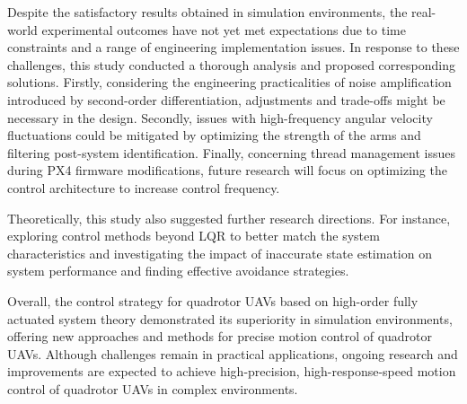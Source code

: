 \begin{digest}
Despite the satisfactory results obtained in simulation environments, the real-world experimental outcomes have not yet met expectations due to time constraints and a range of engineering implementation issues. In response to these challenges, this study conducted a thorough analysis and proposed corresponding solutions. Firstly, considering the engineering practicalities of noise amplification introduced by second-order differentiation, adjustments and trade-offs might be necessary in the design. Secondly, issues with high-frequency angular velocity fluctuations could be mitigated by optimizing the strength of the arms and filtering post-system identification. Finally, concerning thread management issues during PX4 firmware modifications, future research will focus on optimizing the control architecture to increase control frequency.

Theoretically, this study also suggested further research directions. For instance, exploring control methods beyond LQR to better match the system characteristics and investigating the impact of inaccurate state estimation on system performance and finding effective avoidance strategies.

Overall, the control strategy for quadrotor UAVs based on high-order fully actuated system theory demonstrated its superiority in simulation environments, offering new approaches and methods for precise motion control of quadrotor UAVs. Although challenges remain in practical applications, ongoing research and improvements are expected to achieve high-precision, high-response-speed motion control of quadrotor UAVs in complex environments.
\end{digest}
